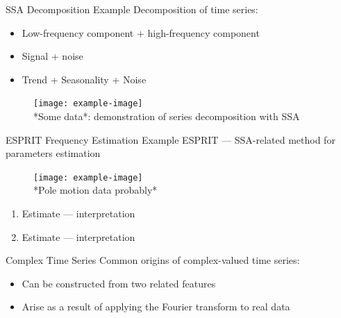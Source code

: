 \documentclass[pdf, unicode, ucs, notheorems]{beamer}
\newcommand{\bluetext}[1]{{\usebeamercolor[fg]{bluetext_color}#1}}
\theoremstyle{definition}
\begin{document}
\begin{frame}{SSA Decomposition Example}
  Decomposition of time series:
  \begin{itemize}
    \item Low-frequency component + high-frequency component
    \item \bluetext{Signal + noise}
    \item Trend + Seasonality + Noise
  \end{itemize}

  \begin{figure}[!ht]
    \center
    \texttt{[image: example-image]}\\
    *Some data*: demonstration of series decomposition with SSA
  \end{figure}
\end{frame}

\begin{frame}{ESPRIT Frequency Estimation Example}
  ESPRIT --- SSA-related method for parameters estimation

  \begin{figure}[!ht]
    \centering
    \texttt{[image: example-image]}\\
    *Pole motion data probably*
  \end{figure}

  \begin{enumerate}
    \item Estimate --- interpretation
    \item Estimate --- interpretation
  \end{enumerate}
\end{frame}

\begin{frame}{Complex Time Series}
  Common origins of complex-valued time series:
  \begin{itemize}
    \item Can be constructed from two related features
    \item Arise as a result of applying the Fourier transform to real data
  \end{itemize}
\end{frame}
\end{document}
